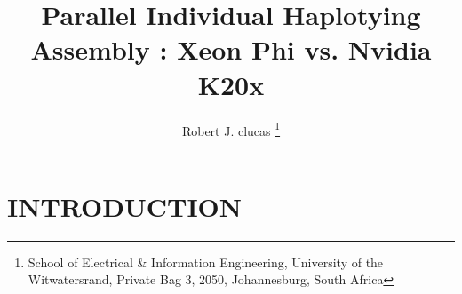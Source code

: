\documentclass[10pt,twocolumn]{witseiepaper}
\begin{document}
\title{Parallel Individual Haplotying Assembly : Xeon Phi vs. Nvidia K20x}

\author{Robert J. clucas
\thanks{School of Electrical \& Information Engineering, University of the
Witwatersrand, Private Bag 3, 2050, Johannesburg, South Africa}
}


\abstract{}


\maketitle
\thispagestyle{empty}\pagestyle{empty}



\section{INTRODUCTION}
\end{document}
